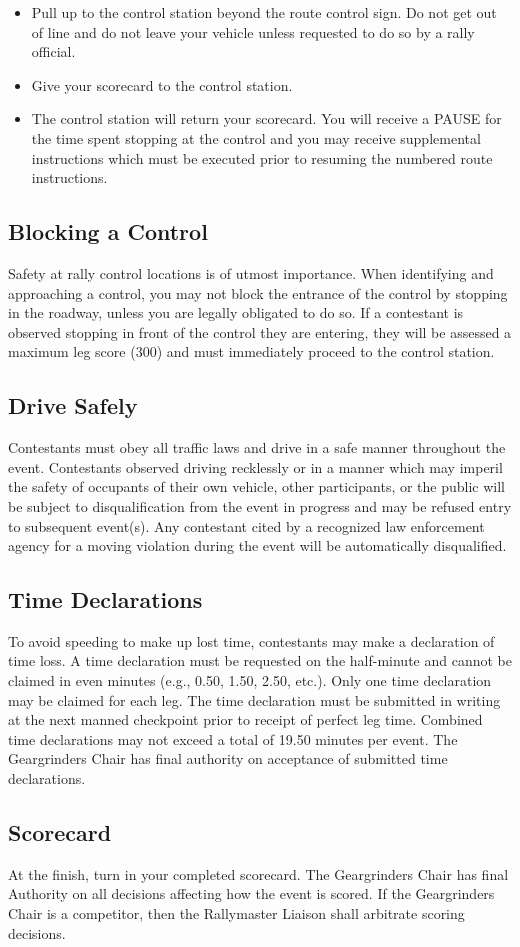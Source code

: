 \begin{itemize}

\item Pull up to the control station beyond the route control sign. Do not get out of line and do not leave your vehicle unless requested to do so by a rally official.

\item Give your scorecard to the control station.

\item The control station will return your scorecard. You will receive a PAUSE for the time spent stopping at the control and you may receive supplemental instructions which must be executed prior to resuming the numbered route instructions.

\end{itemize}

\subsection{Blocking a Control}
Safety at rally control locations is of utmost importance. When identifying and approaching a control, you may not block the entrance of the control by stopping in the roadway, unless you are legally obligated to do so. If a contestant is observed stopping in front of the control they are entering, they will be assessed a maximum leg score (300) and must immediately proceed to the control station.

\subsection{Drive Safely}
Contestants must obey all traffic laws and drive in a safe manner throughout the event. Contestants observed driving recklessly or in a manner which may imperil the safety of occupants of their own vehicle, other participants, or the public will be subject to disqualification from the event in progress and may be refused entry to subsequent event(s). Any contestant cited by a recognized law enforcement agency for a moving violation during the event will be automatically disqualified.

\subsection{Time Declarations}
To avoid speeding to make up lost time, contestants may make a declaration of time loss. A time declaration must be requested on the half-minute and cannot be claimed in even minutes (e.g., 0.50, 1.50, 2.50, etc.). Only one time declaration may be claimed for each leg. The time declaration must be submitted in writing at the next manned checkpoint prior to receipt of perfect leg time. Combined time declarations may not exceed a total of 19.50 minutes per event. The Geargrinders Chair has final authority on acceptance of submitted time declarations.

\subsection{Scorecard}
At the finish, turn in your completed scorecard. The Geargrinders Chair has final Authority on all decisions affecting how the event is scored. If the Geargrinders Chair is a competitor, then the Rallymaster Liaison shall arbitrate scoring decisions.
